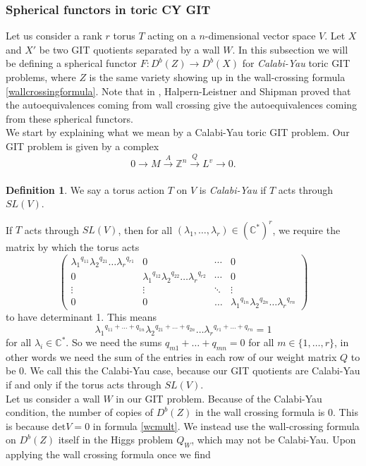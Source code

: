 \documentclass[oneside,reqno]{amsart}
\theoremstyle{definition}
\newtheorem{definition}{Definition}[section]
\theoremstyle{definition}
\theoremstyle{definition}
\theoremstyle{definition}
\newcommand{\CC}{\mathbb{C}}
\newcommand{\Z}{\mathbb{Z}}
\begin{document}
\subsubsection*{Spherical functors in toric CY GIT}
Let us consider a rank $r$ torus $T$ acting on a $n$-dimensional vector space $V$. Let $X$ and $X'$ be two GIT quotients separated by a wall $W$. In this subsection we will be defining a spherical functor $F : D^b(Z) \to D^b(X) $ for \textit{Calabi-Yau} toric GIT problems, where $Z$ is the same variety showing up in the wall-crossing formula \eqref{wallcrossingformula}. Note that in \cite{gitauto}, Halpern-Leistner and Shipman proved that the autoequivalences coming from wall crossing give the autoequivalences coming from these spherical functors. \\
\newline
We start by explaining what we mean by a Calabi-Yau toric GIT problem. Our GIT problem is given by a complex
$$
0 \xrightarrow[]{} M \xrightarrow[]{A} \Z^n \xrightarrow[]{Q} L^v \xrightarrow[]{} 0.
$$
\begin{definition}
    We say a torus action $T$ on $V$ is \textit{Calabi-Yau} if $T$ acts through $SL(V)$.
\end{definition}
If $T$ acts through $SL(V)$, then for all $(\lambda_1, \dots, \lambda_r) \in (\CC^*)^r$, we require the matrix by which the torus acts 
$$
\begin{pmatrix}
{\lambda_1}^{q_{11}}{\lambda_2}^{q_{21}}\dots {\lambda_r}^{q_{r1}} & 0 & \cdots & 0 \\
0 & {\lambda_1}^{q_{12}}{\lambda_2}^{q_{22}}\dots {\lambda_r}^{q_{r2}} & \cdots & 0 \\
\vdots & \vdots &  \ddots & \vdots \\
0 & 0 & \dots & {\lambda_1}^{q_{1n}}{\lambda_2}^{q_{2n}}\dots {\lambda_r}^{q_{rn}}
\end{pmatrix}
$$
to have determinant 1. This means
$$
{\lambda_1}^{q_{11} + \dots + q_{1n}} {\lambda_2}^{q_{21} + \dots + q_{2n}}
\dots {\lambda_r}^{q_{r1} + \dots + q_{rn}} = 1
$$
for all $\lambda_i \in \CC^*$. So we need the sums $q_{m1} + \dots + q_{mn} = 0$ for all $m \in \{1, \dots, r \}$, in other words we need the sum of the entries in each row of our weight matrix $Q$ to be 0. We call this the Calabi-Yau case, because our GIT quotients are Calabi-Yau if and only if the torus acts through $SL(V)$.\\
\newline
Let us consider a wall $W$ in our GIT problem. Because of the Calabi-Yau condition, the number of copies of $D^b(Z)$ in the wall crossing formula is 0. This is because $\text{det}V=0$ in formula \eqref{wcmult}. We instead use the wall-crossing formula on $D^b(Z)$ itself in the Higgs problem $Q_W$, which may not be Calabi-Yau. Upon applying the wall crossing formula once we find
\end{document}
